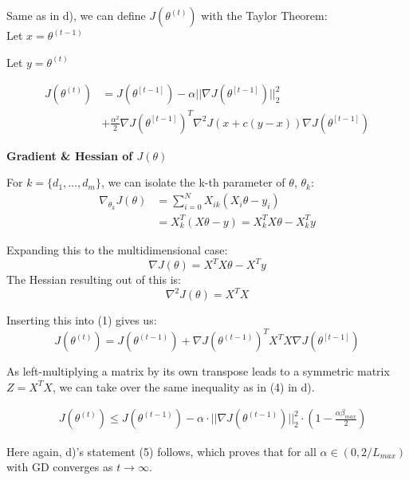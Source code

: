\begin{answer}

Same as in d), we can define $J(\theta^{(t)})$ with the Taylor Theorem: \\

Let $x = \theta^{(t-1)}$

Let $y = \theta^{(t)}$

\setcounter{equation}{0}

\begin{equation}
    \begin{aligned}
        J(\theta^{(t)}) &= J(\theta^{[t-1]}) - \alpha ||\nabla J(\theta^{[t-1]})||_2^2 \\
        &+ \frac{\alpha^2}{2} \nabla J(\theta^{[t-1]})^T \nabla^2 J(x+c(y-x)) \nabla J(\theta^{[t-1]})
        \text{}
    \end{aligned}
\end{equation}

\textbf{Gradient \& Hessian of $J(\theta)$}

For $k=\{d_1, \dots, d_m\}$, we can isolate the k-th parameter of $\theta$, $\theta_k$:
\begin{align*}
    \nabla_{\theta_k} J(\theta) &= \sum_{i=0}^N X_{ik} (X_i \theta - y_i) \\
    &= X_k^T (X\theta - y) = X_k^T X \theta - X_k^T y
\end{align*}


Expanding this to the multidimensional case:
\[
  \nabla J(\theta) = X^T X \theta - X^T y
\]
The Hessian resulting out of this is:
\[
    \nabla^2 J(\theta) = X^T X
\]

Inserting this into (1) gives us:
    \[
    J(\theta^{(t)}) = J(\theta^{(t-1)}) + \nabla J(\theta^{(t-1)})^T X^T X\nabla J(\theta^{[t-1]})
\]

As left-multiplying a matrix by its own transpose leads to a symmetric matrix $Z = X^T X$, we can take over the same inequality as in (4) in d).

\begin{align}
    \quad J(\theta^{(t)}) \leq J(\theta^{(t-1)}) - \alpha \cdot ||\nabla J(\theta^{(t-1)})||_2^2 \cdot \left(1 - \frac{\alpha \beta_{max}}{2}\right)
\end{align}

Here again, d)'s statement (5) follows, which proves that for all $\alpha \in (0, 2/L_{max})$ with GD converges as $t \to \infty$.

\end{answer}

